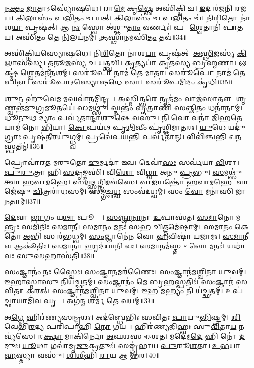 \ul{𑌨}\ul{𑌕𑍍𑌤𑌂} \ul{𑌜𑌾}𑌤𑌾\-𑌽𑌸𑍍𑌯𑍋॑𑌷𑌧𑍇।
𑌰𑌾\ul{𑌮𑍇} 𑌕𑍃\ul{𑌷𑍍𑌣𑍇} 𑌅𑌸𑌿॑𑌕𑍍𑌨𑌿 𑌚।
\ul{𑌇}𑌦 𑌰॑𑌜𑌨𑌿 𑌰𑌜𑌯।
\ul{𑌕𑌿}𑌲𑌾𑌸𑌂॑ 𑌪\ul{𑌲𑌿}𑌤𑌂 \ul{𑌚} 𑌯𑌤𑍍।
\ul{𑌕𑌿}𑌲𑌾𑌸𑌂॑ 𑌚 𑌪\ul{𑌲𑌿}𑌤𑌂 𑌚॑।
𑌨𑌿\ul{𑌰𑌿}𑌤𑍋 𑌨𑌾॑𑌶\ul{𑌯𑌾} 𑌪𑍃𑌷॑𑌤𑍍।
𑌆 \ul{𑌨𑌃} 𑌸𑍍𑌵𑍋 𑌅॑𑌶𑍍𑌞𑍁\ul{𑌤𑌾𑌂} 𑌵𑌰𑍍𑌣𑌃॑।
𑌪𑌰𑌾᳚ \ul{𑌶𑍍𑌵𑍇}𑌤𑌾𑌨𑌿॑ 𑌪𑌾𑌤𑌯।
𑌅𑌸𑌿॑𑌤𑌂 𑌤𑍇 \ul{𑌨𑌿}𑌲𑌯॑𑌨𑌮𑍍।
\ul{𑌆}𑌸𑍍𑌥𑌾\ul{𑌨}𑌮𑌸𑌿॑\ul{𑌤𑌂} 𑌤𑌵॑॥34॥

𑌅𑌸𑌿॑𑌕𑍍𑌨𑌿𑌯𑌸𑍍𑌯𑍋𑌷𑌧𑍇।
𑌨𑌿\ul{𑌰𑌿}𑌤𑍋 𑌨𑌾॑𑌶\ul{𑌯𑌾} 𑌪𑍃𑌷॑𑌤𑍍।
\ul{𑌅}\ul{𑌸𑍍𑌥𑌿}𑌜𑌸𑍍𑌯॑ \ul{𑌕𑌿}𑌲𑌾𑌸॑𑌸𑍍𑌯।
\ul{𑌤}\ul{𑌨𑍂}𑌜𑌸𑍍𑌯॑ \ul{𑌚} 𑌯\ul{𑌤𑍍𑌤𑍍𑌵}𑌚𑌿।
\ul{𑌕𑍃}𑌤𑍍𑌯𑌯𑌾॑ \ul{𑌕𑍃}𑌤\ul{𑌸𑍍𑌯} 𑌬𑍍𑌰𑌹𑍍𑌮॑𑌣𑌾।
𑌲𑌕𑍍𑌷𑍍𑌮॑ \ul{𑌶𑍍𑌵𑍇}𑌤𑌮॑𑌨𑍀𑌨𑌶𑌮𑍍।
𑌸𑌰𑍂॑\ul{𑌪𑌾} 𑌨𑌾𑌮॑ 𑌤𑍇 \ul{𑌮𑌾}𑌤𑌾।
𑌸𑌰𑍂॑\ul{𑌪𑍋} 𑌨𑌾𑌮॑ 𑌤𑍇 \ul{𑌪𑌿}𑌤𑌾।
𑌸𑌰𑍂॑𑌪𑌾\-𑌽𑌸𑍍𑌯𑍋𑌷\ul{𑌧𑍇} 𑌸𑌾।
𑌸𑌰𑍂॑𑌪\ul{𑌮𑌿}𑌦𑌂 𑌕𑍃॑𑌧𑌿॥35॥

\ul{𑌶𑍁}𑌨 𑌹𑍁॑𑌵𑍇𑌮 \ul{𑌮}𑌘𑌵𑌾॑\ul{𑌨}𑌮𑌿𑌨𑍍𑌦𑍍𑌰𑌮𑍍᳚।
\ul{𑌅}𑌸𑍍𑌮𑌿𑌨𑍍𑌭\ul{𑌰𑍇} 𑌨𑍃𑌤॑\ul{𑌮𑌂} 𑌵𑌾𑌜॑𑌸𑌾𑌤𑍗।
\ul{𑌶𑍃}𑌣𑍍𑌵𑌨𑍍𑌤॑\ul{𑌮𑍁}𑌗𑍍𑌰\ul{𑌮𑍂}𑌤𑌯𑍇॑ \ul{𑌸}𑌮𑌥𑍍𑌸𑍁॑।
𑌘𑍍𑌨𑌨𑍍𑌤𑌂॑ \ul{𑌵𑍃}𑌤𑍍𑌰𑌾𑌣𑌿॑ \ul{𑌸}𑌞𑍍𑌜𑌿\ul{𑌤𑌂} 𑌧𑌨𑌾॑𑌨𑌾𑌮𑍍।
\ul{𑌧𑍂}\ul{𑌨𑍁}𑌥 𑌦𑍍𑌯𑌾𑌂 𑌪𑌰𑍍𑌵॑𑌤𑌾\ul{𑌨𑍍𑌦𑌾}𑌶𑍁\ul{𑌷𑍇} 𑌵𑌸𑍁॑।
𑌨𑌿 \ul{𑌵𑍋} 𑌵𑌨𑌾॑ 𑌜𑌿𑌹\ul{𑌤𑍇} 𑌯𑌾𑌮॑ 𑌨𑍋 \ul{𑌭𑌿}𑌯𑌾।
\ul{𑌕𑍋}𑌪𑌯॑𑌥 𑌪𑍃\ul{𑌥𑌿}𑌵𑍀𑌂 𑌪𑍃॑𑌶𑍍𑌞𑌿𑌮𑌾𑌤𑌰𑌃।
\ul{𑌯𑍁}𑌧𑍇 𑌯𑌦𑍁॑\ul{𑌗𑍍𑌰𑌾𑌃} 𑌪𑍃𑌷॑\ul{𑌤𑍀}𑌰𑌯𑍁॑𑌗𑍍𑌧𑍍𑌵𑌮𑍍।
𑌪𑍍𑌰𑌵𑍇॑𑌪𑌯\ul{𑌨𑍍𑌤𑌿} 𑌪𑌰𑍍𑌵॑𑌤𑌾𑌨𑍍।
𑌵𑌿𑌵𑌿॑𑌞𑍍𑌚\ul{𑌨𑍍𑌤𑌿} 𑌵\ul{𑌨}𑌸𑍍𑌪𑌤𑍀𑌨𑍍॑॥36॥

𑌪𑍍𑌰𑍋𑌵𑌾॑𑌰𑌤 𑌮𑌰𑍁𑌤𑍋 \ul{𑌦𑍁}𑌰𑍍𑌮𑌦𑌾॑ 𑌇𑌵।
𑌦𑍇𑌵𑌾॑\ul{𑌸𑌃} 𑌸𑌰𑍍𑌵॑𑌯𑌾 \ul{𑌵𑌿}𑌶𑌾।
\ul{𑌪𑍁}\ul{𑌰𑍁}𑌤𑍍𑌰𑌾 𑌹𑌿 \ul{𑌸}𑌦𑍃𑌙𑍍𑌙𑌸𑌿॑।
𑌵𑌿\ul{𑌶𑍋} 𑌵𑌿\ul{𑌶𑍍𑌵𑌾} 𑌅𑌨𑍁॑ \ul{𑌪𑍍𑌰}𑌭𑍁।
\ul{𑌸}𑌮𑌥𑍍𑌸𑍁॑ 𑌤𑍍𑌵𑌾 𑌹𑌵𑌾𑌮𑌹𑍇।
\ul{𑌸}𑌮\ul{𑌥𑍍𑌸𑍍𑌵}𑌗𑍍𑌨𑌿𑌮𑌵॑𑌸𑍇।
\ul{𑌵𑌾}\ul{𑌜}𑌯𑌨𑍍𑌤𑍋॑ 𑌹𑌵𑌾𑌮𑌹𑍇।
𑌵𑌾𑌜𑍇॑𑌷𑍁 \ul{𑌚𑌿}𑌤𑍍𑌰𑌰𑌾॑𑌧𑌸𑌮𑍍।
𑌸𑌙𑍍𑌗॑𑌚𑍍𑌛\ul{𑌧𑍍𑌵}\ul{} 𑌸𑌂𑌵॑𑌦𑌧𑍍𑌵𑌮𑍍।
𑌸𑌂 \ul{𑌵𑍋} 𑌮𑌨𑌾॑𑌸𑌿 𑌜𑌾𑌨𑌤𑌾𑌮𑍍॥37॥

\ul{𑌦𑍇}𑌵𑌾 \ul{𑌭𑌾}𑌗𑌂 𑌯\ul{𑌥𑌾} 𑌪𑍂𑌰𑍍𑌵𑍇᳚।
\ul{𑌸}\ul{𑌞𑍍𑌜𑌾}\ul{𑌨𑌾}𑌨𑌾 \ul{𑌉}𑌪𑌾𑌸॑𑌤।
\ul{𑌸}\ul{𑌮𑌾}𑌨𑍋 𑌮\ul{𑌨𑍍𑌤𑍍𑌰𑌃} 𑌸𑌮𑌿॑𑌤𑌿𑌃 𑌸\ul{𑌮𑌾}𑌨𑍀।
\ul{𑌸}\ul{𑌮𑌾}𑌨𑌂 𑌮𑌨𑌃॑ \ul{𑌸}𑌹 \ul{𑌚𑌿}𑌤𑍍𑌤𑌮𑍇॑𑌷𑌾𑌮𑍍।
\ul{𑌸}\ul{𑌮𑌾}𑌨𑌂 𑌕𑍇𑌤𑍋॑ \ul{𑌅}𑌭𑌿 𑌸 𑌰॑𑌭𑌧𑍍𑌵𑌮𑍍।
\ul{𑌸𑌂}𑌜𑍍𑌞𑌾𑌨𑍇॑𑌨 𑌵𑍋 \ul{𑌹}𑌵𑌿𑌷𑌾॑ 𑌯𑌜𑌾𑌮𑌃।
\ul{𑌸}\ul{𑌮𑌾}𑌨𑍀 \ul{𑌵} 𑌆𑌕𑍂॑𑌤𑌿𑌃।
\ul{𑌸}\ul{𑌮𑌾}𑌨𑌾 𑌹𑍃𑌦॑𑌯𑌾𑌨𑌿 𑌵𑌃।
\ul{𑌸}\ul{𑌮𑌾}𑌨𑌮॑𑌸𑍍𑌤𑍁 \ul{𑌵𑍋} 𑌮𑌨𑌃॑।
𑌯𑌥𑌾॑ \ul{𑌵𑌃} 𑌸𑍁\ul{𑌸}𑌹𑌾𑌸॑𑌤𑌿॥38॥

\ul{𑌸𑌂}𑌜𑍍𑌞𑌾𑌨𑌂॑ \ul{𑌨𑌃} 𑌸𑍍𑌵𑍈𑌃।
\ul{𑌸𑌂}𑌜𑍍𑌞𑌾\ul{𑌨}𑌮𑌰॑𑌣𑍈𑌃।
\ul{𑌸𑌂}𑌜𑍍𑌞𑌾𑌨॑𑌮𑌶𑍍𑌵𑌿𑌨𑌾 \ul{𑌯𑍁}𑌵𑌮𑍍।
\ul{𑌇}𑌹𑌾𑌸𑍍𑌮𑌾\ul{𑌸𑍁} 𑌨𑌿𑌯॑𑌚𑍍𑌛𑌤𑌮𑍍।
\ul{𑌸𑌂}𑌜𑍍𑌞𑌾𑌨𑌂॑ \ul{𑌮𑍇} 𑌬𑍃\ul{𑌹}𑌸𑍍𑌪𑌤𑌿𑌃॑।
\ul{𑌸𑌂}𑌜𑍍𑌞𑌾𑌨॑ 𑌸\ul{𑌵𑌿}𑌤𑌾 𑌕॑𑌰𑌤𑍍।
\ul{𑌸𑌂}𑌜𑍍𑌞𑌾𑌨॑𑌮𑌶𑍍𑌵𑌿𑌨𑌾 \ul{𑌯𑍁}𑌵𑌮𑍍।
\ul{𑌇}𑌹 𑌮\ul{𑌹𑍍𑌯𑌂} 𑌨𑌿 𑌯॑𑌚𑍍𑌛𑌤𑌮𑍍।
𑌉𑌪॑ \ul{𑌚𑍍𑌛𑌾}𑌯𑌾𑌮𑌿॑\ul{𑌵} 𑌘𑍃𑌣𑍇𑌃᳚।
𑌅𑌗॑\ul{𑌨𑍍𑌮} 𑌶𑌰𑍍𑌮॑ 𑌤𑍇 \ul{𑌵}𑌯𑌮𑍍॥39॥

𑌅\ul{𑌗𑍍𑌨𑍇} 𑌹𑌿𑌰॑𑌣𑍍𑌯𑌸𑌨𑍍𑌦𑍃𑌶𑌃।
𑌅𑌦॑𑌬𑍍𑌧𑍇𑌭𑌿𑌃 𑌸𑌵𑌿𑌤𑌃 \ul{𑌪𑌾}𑌯𑍁\ul{𑌭𑌿}𑌷𑍍𑌟𑍍𑌵𑌮𑍍।
\ul{𑌶𑌿}𑌵𑍇𑌭𑌿॑\ul{𑌰}𑌦𑍍𑌯 𑌪𑌰𑌿॑𑌪𑌾𑌹𑌿 \ul{𑌨𑍋} 𑌗𑌯𑌮𑍍᳚।
𑌹𑌿𑌰॑𑌣𑍍𑌯𑌜𑌿𑌹𑍍𑌵𑌃 𑌸𑍁\ul{𑌵𑌿}𑌤𑌾\ul{𑌯} 𑌨𑌵𑍍𑌯॑𑌸𑍇।
𑌰\ul{𑌕𑍍𑌷𑌾} 𑌮𑌾𑌕𑌿॑𑌰𑍍𑌨𑍋 \ul{𑌅}𑌘𑌶॑𑌸 𑌈𑌶𑌤।
𑌮𑌦𑍇॑𑌮\ul{𑌦𑍇} 𑌹𑌿 𑌨𑍋॑ \ul{𑌦}𑌦𑍁𑌃।
\ul{𑌯𑍂}𑌥𑌾 𑌗𑌵𑌾॑𑌮𑍃\ul{𑌜𑍁}𑌕𑍍𑌰𑌤𑍁𑌃॑।
𑌸𑌙𑍍𑌗𑍃॑𑌭𑌾𑌯 \ul{𑌪𑍁}𑌰𑍂\ul{𑌶}𑌤𑌾।
\ul{𑌉}\ul{𑌭}𑌯𑌾 \ul{𑌹}𑌸𑍍𑌤𑍍𑌯𑌾 𑌵𑌸𑍁॑।
\ul{𑌶𑌿}\ul{𑌶𑍀}𑌹𑌿 \ul{𑌰𑌾}𑌯 𑌆 𑌭॑𑌰॥40॥

